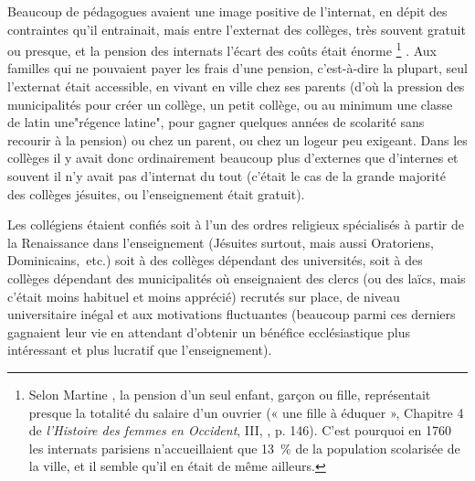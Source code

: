 Beaucoup de pédagogues avaient une image positive de l'internat, en dépit des contraintes qu'il entrainait, mais entre l'externat des collèges, très souvent gratuit ou presque, et la pension des internats l'écart des coûts était énorme%
\footnote{Selon Martine , la pension d'un seul enfant, garçon ou fille, représentait presque la totalité du salaire d'un ouvrier (« une fille à éduquer », Chapitre 4 de \emph{l'Histoire des femmes en Occident}, III, , p. 146). C'est pourquoi en 1760 les internats parisiens n'accueillaient que 13~\% de la population scolarisée de la ville, et il semble qu'il en était de même ailleurs.}%
. Aux familles qui ne pouvaient payer les frais d'une pension, c'est-à-dire la plupart, seul l'externat était accessible, en vivant en ville chez ses parents (d'où la pression des municipalités pour créer un collège, un petit collège, ou au minimum une classe de latin une"régence latine", pour gagner quelques années de scolarité sans recourir à la pension) ou chez un parent, ou chez un logeur peu exigeant. Dans les collèges il y avait donc ordinairement beaucoup plus d'externes que d'internes et souvent il n'y avait pas d'internat du tout (c'était le cas de la grande majorité des collèges jésuites, ou l'enseignement était gratuit). 

 
 

Les collégiens étaient confiés soit à l'un des ordres religieux spécialisés à partir de la Renaissance dans l'enseignement (Jésuites surtout, mais aussi Oratoriens, Dominicains,~etc.) soit à des collèges dépendant des universités, soit à des collèges dépendant des municipalités où enseignaient des clercs (ou des laïcs, mais c'était moins habituel et moins apprécié) recrutés sur place, de niveau universitaire inégal et aux motivations fluctuantes (beaucoup parmi ces derniers gagnaient leur vie en attendant d'obtenir un bénéfice ecclésiastique plus intéressant et plus lucratif que l'enseignement). 

